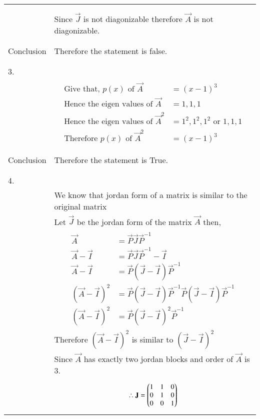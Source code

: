 \begin{longtable}{|l|l|}
{\begin{align*}
\end{align*}}\\
&Since $\vec{J}$ is not diagonizable therefore $\vec{A}$ is not diagonizable.\\
&\\
\hline
&\\
Conclusion&Therefore the statement is false.\\
&\\
\hline
&\\
3.&\\
&\parbox{10cm}{\begin{align*}
    \mbox{Give that, }p(x)\mbox{ of }\vec{A}&=(x-1)^3\\
    \mbox{Hence the eigen values of }\vec{A}&=1,1,1\\
    \mbox{Hence the eigen values of }\vec{A}^2&=1^2,1^2,1^2\mbox{ or } 1,1,1\\
    \mbox{Therefore }p(x)\mbox{ of }\vec{A}^2&=(x-1)^3
\end{align*}}\\
&\\
\hline
&\\
Conclusion&Therefore the statement is True.\\
&\\
\hline
\pagebreak
\hline
&\\
4.&\\
&We know that jordan form of a matrix is similar to the original matrix\\
&Let $\vec{J}$ be the jordan form of the matrix $\vec{A}$ then,\\
&\parbox{6cm}{\begin{align*}
    \vec{A}&=\vec{P}\vec{J}\vec{P}^{-1}\\
    \vec{A}-\vec{I}&=\vec{P}\vec{J}\vec{P}^{-1}-\vec{I}\\
    \vec{A}-\vec{I}&=\vec{P}(\vec{J}-\vec{I})\vec{P}^{-1}\\
    (\vec{A}-\vec{I})^2&=\vec{P}(\vec{J}-\vec{I})\vec{P}^{-1}\vec{P}(\vec{J}-\vec{I})\vec{P}^{-1}\\
    (\vec{A}-\vec{I})^2&=\vec{P}(\vec{J}-\vec{I})^2\vec{P}^{-1}
\end{align*}}\\
&Therefore $(\vec{A}-\vec{I})^2$ is similar to $(\vec{J}-\vec{I})^2$\\
&Since $\vec{A}$ has exactly two jordan blocks and order of $\vec{A}$ is 3.\\
&\parbox{6cm}{\begin{align*}
    \therefore \vec{J}&=\myvec{1&1&0\\0&1&0\\0&0&1}\\

\end{align*}}
\end{longtable}
